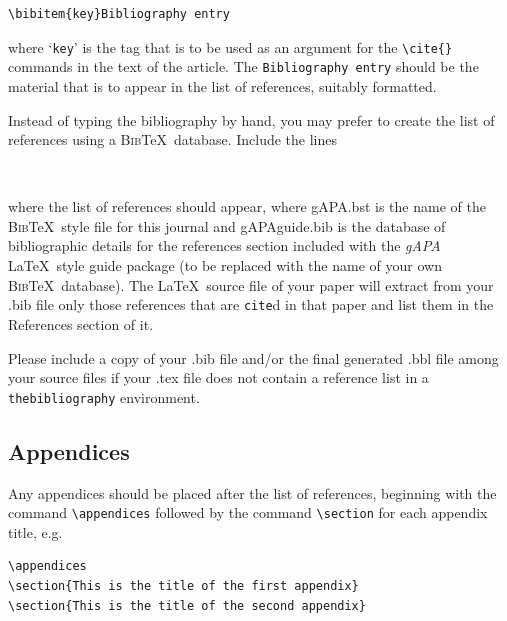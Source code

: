 \documentclass{gAPA2e}
\theoremstyle{plain}
\theoremstyle{remark}
\theoremstyle{definition}
\begin{document}
\begin{verbatim}
\bibitem{key}Bibliography entry
\end{verbatim}

\noindent where `{\tt key}' is the tag that is to be used as an argument for the \verb"\cite{}" commands in the text of the article. The {\tt Bibliography entry} should be the material that is to appear in the list of references, suitably formatted.

Instead of typing the bibliography by hand, you may prefer to create the list of references using a \textsc{Bib}\TeX\ database. Include the lines

\begin{verbatim}


\end{verbatim}

\noindent where the list of references should appear, where gAPA.bst is the name of the \textsc{Bib}\TeX\ style file for this journal and gAPAguide.bib is the database of bibliographic details for the references section included with the \textit{gAPA} \LaTeX\ style guide package (to be replaced with the name of your own \textsc{Bib}\TeX\ database). The \LaTeX\ source file of your paper will extract from your .bib file only those references that are \verb"cite"d in that paper and list them in the References section of it.

Please include a copy of your .bib file and/or the final generated .bbl file among your source files if your .tex file does not contain a reference list in a \texttt{thebibliography} environment.


\subsection{Appendices}\label{appendices}

Any appendices should be placed after the list of references, beginning with the
command \verb"\appendices" followed by the command \verb"\section"
for each appendix title, e.g.
%
\begin{verbatim}
\appendices
\section{This is the title of the first appendix}
\section{This is the title of the second appendix}
\end{verbatim}
\end{document}
